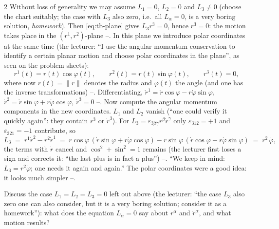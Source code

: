 \begin{paracol}{2}
Without loss of generality we may assume $L_1=0$, $L_2=0$ and $L_3\neq0$ (choose the chart suitably; the case with $L_3$ also zero, i.e.\ all $L_\alpha=0$, is a very boring solution, \emph{homework}). Then \eqref{eq:tb-plane} gives $L_3r^3=0$, hence $r^3=0$: the motion takes place in the $(r^1,r^2)$-plane --.
In this plane we introduce polar coordinates at the same time (the lecturer: ``I use the angular momentum conservation to identify a certain planar motion and choose polar coordinates in the plane'', as seen on the problem sheets):
\begin{equation}\label{eq:tb-polar}
  r^1(t)=r(t)\cos\varphi(t),\qquad r^2(t)=r(t)\sin\varphi(t),\qquad r^3(t)=0,
\end{equation}
where now $r(t)=\|r\|$ denotes the radius and $\varphi(t)$ the angle (and one has the inverse transformations) --. Differentiating, $\dot r^1=\dot r\cos\varphi-r\dot\varphi\sin\varphi$, $\dot r^2=\dot r\sin\varphi+r\dot\varphi\cos\varphi$, $\dot r^3=0$ --.
Now compute the angular momentum components in the new coordinates. $L_1$ and $L_2$ vanish (``one could verify it quickly again'': they contain $r^3$ or $\dot r^3$). For $L_3=\varepsilon_{3\beta\gamma}r^\beta\dot r^\gamma$ only $\varepsilon_{312}=+1$ and $\varepsilon_{321}=-1$ contribute, so
\begin{equation}\label{eq:tb-L3}
  L_3\;=\;r^1\dot r^2-r^2\dot r^1\;=\;r\cos\varphi\,(\dot r\sin\varphi+r\dot\varphi\cos\varphi)-r\sin\varphi\,(\dot r\cos\varphi-r\dot\varphi\sin\varphi)\;=\;r^2\,\dot\varphi ,
\end{equation}
the terms with $\dot r$ cancel and $\cos^2+\sin^2=1$ remains (the lecturer first loses a sign and corrects it: ``the last plus is in fact a plus'') --.
``We keep in mind: $L_3=r^2\dot\varphi$; one needs it again and again.'' The polar coordinates were a good idea: it looks much simpler --.

\begin{exercise}\label{ex:tb-L0}
Discuss the case $L_1=L_2=L_3=0$ left out above (the lecturer: ``the case $L_3$ also zero one can also consider, but it is a very boring solution; consider it as a homework''): what does the equation $L_\alpha=0$ say about $r^\alpha$ and $\dot r^\alpha$, and what motion results? 
\end{exercise}


\end{paracol}
